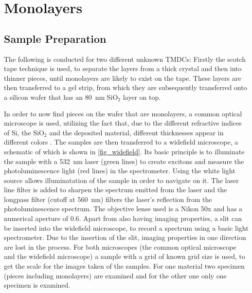 \newpage
\section{Monolayers}
\label{sec:mono}

\subsection{Sample Preparation}

The following is conducted for two different unknown TMDCs:
Firstly the scotch tape technique is used, to separate the layers from a thick crystal and then into thinner pieces, until monolayers are likely to exist on the tape.
These layers are then transferred to a gel strip, from which they are subsequently transferred onto a silicon wafer that has an \SI{80}{nm} SiO$_2$ layer on top.

In order to now find pieces on the wafer that are monolayers, a common optical microscope is used, utilizing the fact that, due to the different refractive indices of Si, the SiO$_2$ and the deposited material, different thicknesses appear in different colors \cite{benameur2011}.
The samples are then transferred to a widefield microscope, a schematic of which is shown in \cref{fig_widefield}.
Its basic principle is to illuminate the sample with a \SI{532}{nm} laser (green lines) to create excitons and measure the photoluminescence light (red lines) in the spectrometer.
Using the white light source allows illuminatation of the sample in order to navigate on it.
The laser line filter is added to sharpen the spectrum emitted from the laser and the longpass filter (cutoff at \SI{560}{nm}) filters the laser's reflection from the photoluminescence spectrum.
The objective lense used is a Nikon 50x and has a numerical aperture of \SI{0.6}{}.
Apart from also having imaging properties, a slit can be inserted into the widefield microscope, to record a spectrum using a basic light spectrometer.
Due to the insertion of the slit, imaging properties in one direction are lost in the process.
For both microscopes (the common optical microscope and the widefield microscope) a sample with a grid of known grid size is used, to get the scale for the images taken of the samples.
For one material two specimen (pieces including monolayers) are examined and for the other one only one specimen is examined.

